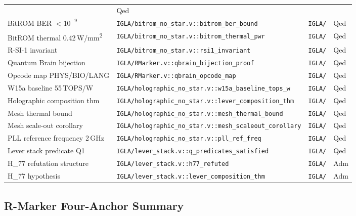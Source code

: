 \begin{table}[ht]
\begin{tabular}{p{4.5cm}p{4.5cm}ll}
      & Qed \\
    BitROM BER $< 10^{-9}$
      & \texttt{IGLA/bitrom\_no\_star.v::bitrom\_ber\_bound}
      & \texttt{IGLA/}
      & Qed \\
    BitROM thermal 0.42\,W/mm\textsuperscript{2}
      & \texttt{IGLA/bitrom\_no\_star.v::bitrom\_thermal\_pwr}
      & \texttt{IGLA/}
      & Qed \\
    R-SI-1 invariant
      & \texttt{IGLA/bitrom\_no\_star.v::rsi1\_invariant}
      & \texttt{IGLA/}
      & Qed \\
    Quantum Brain bijection
      & \texttt{IGLA/RMarker.v::qbrain\_bijection\_proof}
      & \texttt{IGLA/}
      & Qed \\
    Opcode map PHYS/BIO/LANG
      & \texttt{IGLA/RMarker.v::qbrain\_opcode\_map}
      & \texttt{IGLA/}
      & Qed \\
    W15a baseline 55\,TOPS/W
      & \texttt{IGLA/holographic\_no\_star.v::w15a\_baseline\_tops\_w}
      & \texttt{IGLA/}
      & Qed \\
    Holographic composition thm
      & \texttt{IGLA/holographic\_no\_star.v::lever\_composition\_thm}
      & \texttt{IGLA/}
      & Qed \\
    Mesh thermal bound
      & \texttt{IGLA/holographic\_no\_star.v::mesh\_thermal\_bound}
      & \texttt{IGLA/}
      & Qed \\
    Mesh scale-out corollary
      & \texttt{IGLA/holographic\_no\_star.v::mesh\_scaleout\_corollary}
      & \texttt{IGLA/}
      & Qed \\
    PLL reference frequency 2\,GHz
      & \texttt{IGLA/holographic\_no\_star.v::pll\_ref\_freq}
      & \texttt{IGLA/}
      & Qed \\
    Lever stack predicate Q1
      & \texttt{IGLA/lever\_stack.v::q\_predicates\_satisfied}
      & \texttt{IGLA/}
      & Qed \\
    H\_77 refutation structure
      & \texttt{IGLA/lever\_stack.v::h77\_refuted}
      & \texttt{IGLA/}
      & Adm \\
    H\_77 hypothesis
      & \texttt{IGLA/lever\_stack.v::lever\_composition\_thm}
      & \texttt{IGLA/}
      & Adm \\
    \bottomrule
  \end{tabular}
\end{table}

\subsection{R-Marker Four-Anchor Summary}

